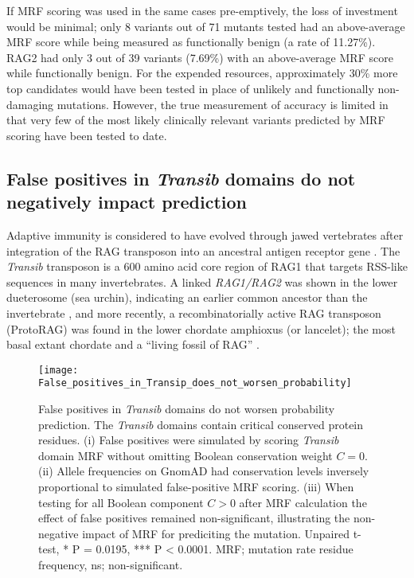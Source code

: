 \documentclass[preprint,11pt,fleqn]{elsarticle}
\begin{document}
If MRF scoring was used in the same cases pre-emptively, the loss of investment  would be minimal; only 8 variants out of 71 mutants tested had an above-average MRF score while being measured as functionally benign (a rate of 11.27\%). 
RAG2 had only 3 out of 39 variants (7.69\%) with an above-average MRF score while functionally benign.
For the expended resources, approximately 30\% more top candidates would have been tested in place of unlikely and functionally non-damaging mutations. 
However, the true measurement of accuracy is limited in that very few of the most likely clinically relevant variants predicted by MRF scoring have been tested to date. 

\subsection*{\textbf{False positives in \textit{Transib} domains do not negatively impact prediction}}
\noindent Adaptive immunity is considered to have evolved through jawed vertebrates after integration of the RAG transposon into an ancestral antigen receptor gene 
\citep{agrawal1998transposition, hiom1998dna}.
The \textit{Transib} transposon is a 600 amino acid core region of RAG1 that targets RSS-like sequences in many invertebrates.
A linked \textit{RAG1/RAG2} was shown in the lower dueterosome (sea urchin), indicating an earlier common ancestor than the invertebrate
\citep{fugmann2006ancient}, 
and more recently,
a recombinatorially active RAG transposon (ProtoRAG) was found in the lower chordate amphioxus (or lancelet); the most basal extant chordate and a ``living fossil of RAG'' 
\citep{huang2016discovery}.

\begin{figure}[h]
\hspace*{0cm}   %
	\texttt{[image: False\_positives\_in\_Transip\_does\_not\_worsen\_probability]}
	\caption{False positives in \textit{Transib} domains do not worsen probability prediction. 
The \textit{Transib} domains contain critical conserved protein residues. 
(i) False positives were simulated by scoring \textit{Transib} domain MRF without omitting Boolean conservation weight $C=0$. 
(ii) Allele frequencies on GnomAD had conservation levels inversely proportional to simulated false-positive MRF scoring. 
(iii) When testing for all Boolean component $C>0$ after MRF calculation the effect of false positives remained non-significant, illustrating the non-negative impact of MRF for prediciting the mutation. Unpaired t-test,  * P = 0.0195, *** P < 0.0001. MRF; mutation rate residue frequency, ns; non-significant.} 	\label{fig:False_positives_in_Transip_does_not_worsen_probability}
\end{figure}
\end{document}
